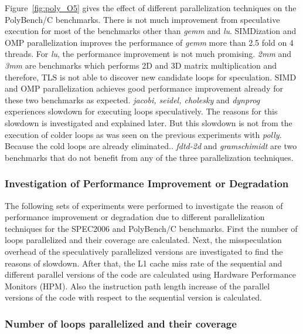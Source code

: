 \documentclass[10pt]{report}          %
\begin{document}
Figure~\ref{fig:poly_O5} gives the effect of different parallelization techniques on the PolyBench/C benchmarks. There is not much improvement from speculative execution for most of the benchmarks other than \textit{gemm} and \textit{lu}. SIMDization and OMP parallelization improves the performance of \textit{gemm} more than 2.5 fold on 4 threads.  For \textit{lu}, the performance improvement is not much promising. \textit{2mm} and \textit{3mm} are benchmarks which performs 2D and 3D matrix multiplication and therefore, TLS is not able to discover new candidate loops for speculation.  SIMD and OMP parallelization achieves good performance improvement already for these two benchmarks as expected. \textit{ jacobi, seidel, cholesky} and \textit{dynprog} experiences slowdown for executing loops speculatively.  The reasons for this slowdown is investigated and explained later.  But this slowdown is not from the execution of colder loops as was seen on the previous experiments with \textit{polly}.  Because the cold loops are already eliminated..  \textit{fdtd-2d} and \textit{gramschimidt} are two benchmarks that do not benefit from any of the three parallelization techniques.

\subsubsection{Investigation of Performance Improvement or Degradation}

The following sets of experiments were performed to investigate the reason of performance improvement or degradation due to different parallelization techniques for the SPEC2006 and PolyBench/C benchmarks.  First the number of loops parallelized and their coverage are calculated.  Next, the misspeculation overhead of the speculatively parallelized versions are investigated to find the reasons of slowdown.  After that, the L1 cache miss rate of the sequential and different parallel versions of the code are calculated using Hardware Performance Monitors (HPM).  Also the instruction path length increase of the parallel versions of the code with respect to the sequential version is calculated.

\subsubsection{Number of loops parallelized and their coverage}
\end{document}
